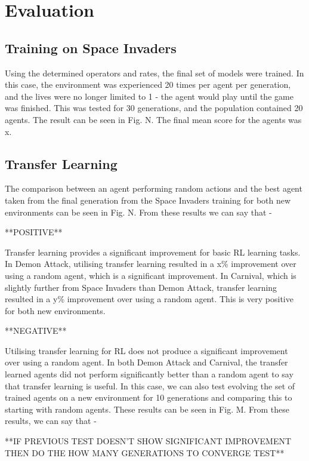 \chapter{Evaluation}

\label{ch:eval}

\section{Training on Space Invaders}

Using the determined operators and rates, the final set of models were trained. In this case, the environment was experienced 20 times per agent per generation, and the lives were no longer limited to 1 - the agent would play until the game was finished. This was tested for 30 generations, and the population contained 20 agents. The result can be seen in Fig. N. The final mean score for the agents was x.

\section{Transfer Learning}

The comparison between an agent performing random actions and the best agent taken from the final generation from the Space Invaders training for both new environments can be seen in Fig. N. From these results we can say that -

**POSITIVE**

Transfer learning provides a significant improvement for basic RL learning tasks. In Demon Attack, utilising transfer learning resulted in a x\% improvement over using a random agent, which is a significant improvement. In Carnival, which is slightly further from Space Invaders than Demon Attack, transfer learning resulted in a y\% improvement over using a random agent. This is very positive for both new environments.

**NEGATIVE**

Utilising transfer learning for RL does not produce a significant improvement over using a random agent. In both Demon Attack and Carnival, the transfer learned agents did not perform significantly better than a random agent to say that transfer learning is useful. In this case, we can also test evolving the set of trained agents on a new environment for 10 generations and comparing this to starting with random agents. These results can be seen in Fig. M. From these results, we can say that - 




**IF PREVIOUS TEST DOESN'T SHOW SIGNIFICANT IMPROVEMENT THEN DO THE HOW MANY GENERATIONS TO CONVERGE TEST**
